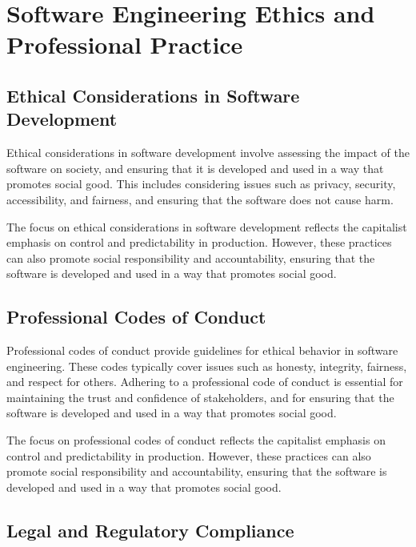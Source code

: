 \begin{refsection}
\begin{multicols}{2}
{}
\end{multicols}
\newpage

\section{Software Engineering Ethics and Professional Practice}
\begin{multicols}{2}
{\small

\subsection{Ethical Considerations in Software Development}

Ethical considerations in software development involve assessing the impact of the software on society, and ensuring that it is developed and used in a way that promotes social good. This includes considering issues such as privacy, security, accessibility, and fairness, and ensuring that the software does not cause harm.

The focus on ethical considerations in software development reflects the capitalist emphasis on control and predictability in production. However, these practices can also promote social responsibility and accountability, ensuring that the software is developed and used in a way that promotes social good.

\subsection{Professional Codes of Conduct}

Professional codes of conduct provide guidelines for ethical behavior in software engineering. These codes typically cover issues such as honesty, integrity, fairness, and respect for others. Adhering to a professional code of conduct is essential for maintaining the trust and confidence of stakeholders, and for ensuring that the software is developed and used in a way that promotes social good.

The focus on professional codes of conduct reflects the capitalist emphasis on control and predictability in production. However, these practices can also promote social responsibility and accountability, ensuring that the software is developed and used in a way that promotes social good.

\subsection{Legal and Regulatory Compliance}

}
\end{multicols}
\end{refsection}
